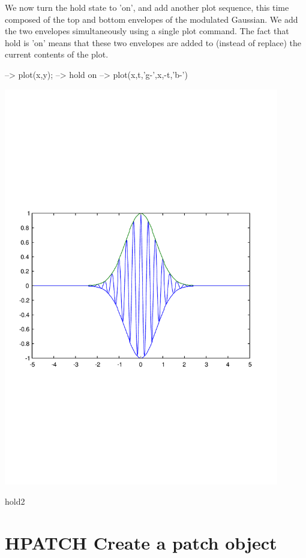 We now turn the hold state to {\ttfamily 'on'}, and add another plot sequence, this time composed of the top and bottom envelopes of the modulated Gaussian. We add the two envelopes simultaneously using a single {\ttfamily plot} command. The fact that {\ttfamily hold} is {\ttfamily 'on'} means that these two envelopes are added to (instead of replace) the current contents of the plot.


\begin{DoxyVerbInclude}
--> plot(x,y);
--> hold on
--> plot(x,t,'g-',x,-t,'b-')
\end{DoxyVerbInclude}


 
\begin{DoxyImage}
\includegraphics[width=12cm]{hold2}
\caption{hold2}
\end{DoxyImage}
 \hypertarget{handle_hpatch}{}\section{H\-P\-A\-T\-C\-H Create a patch object}\label{handle_hpatch}
